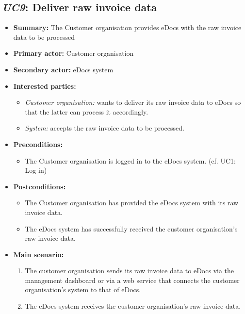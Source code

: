\documentclass[a4paper,10pt]{article}
\begin{document}
\subsection{\emph{UC9}: Deliver raw invoice data}
\label{usecase:deliverrawinvoicedata}
\begin{itemize}
    \item \textbf{Summary:} The Customer organisation provides eDocs with the raw invoice data to be processed
    \item \textbf{Primary actor:} Customer organisation
    \item \textbf{Secondary actor:} eDocs system
    \item \textbf{Interested parties:} 
        \begin{itemize}
            \item \textit{Customer organisation:} wants to deliver its raw invoice data to eDocs so that the latter can process it accordingly.
            \item \textit{System:} accepts the raw invoice data to be processed.
        \end{itemize}
    \item \textbf{Preconditions:}
        \begin{itemize}
            \item The Customer organisation is logged in to the eDocs system. (cf. UC1: Log in)
        \end{itemize}
    \item \textbf{Postconditions:}
        \begin{itemize}
            \item The Customer organisation has provided the eDocs system with its raw invoice data.
            \item The eDocs system has successfully received the customer organisation's raw invoice data.
        \end{itemize}
        
    \item \textbf{Main scenario:} 
    \begin{enumerate}
       \item The customer organisation sends its raw invoice data to eDocs via the management dashboard or via a web service that connects the customer organisation's system to that of eDocs.
       \item The eDocs system receives the customer organisation's raw invoice data.
    \end{enumerate}
\end{itemize}
\end{document}
